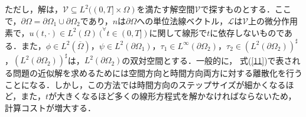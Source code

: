 \documentclass[a4paper,12pt]{nodlabpabw}
\begin{document}
ただし，解は，$\mathcal{V}\subseteq L^2((0,T]\times\Omega)$を満たす解空間$\mathcal{V}$で探すものとする．ここで，$\partial \Omega=\partial \Omega_1\cup\partial\Omega_2$であり，$n$は$\partial \Omega$への単位法線ベクトル，$\mathcal{L}$は$\mathcal{V}$上の微分作用素で，$u(t,\cdot)\in L^2(\Omega)\ (^{\forall} t\in(0,T])$に関して線形で$t$に依存しないものである．また，$\phi\in L^2(\overline{\Omega})$，$\psi\in L^2(\partial\Omega_1)$，$\tau_1\in L^{\infty}(\partial\Omega_2)$，$\tau_2\in (L^2(\partial\Omega_2))^{\sharp}$，$(L^2(\partial\Omega_2))^{\sharp}$は，$L^2(\partial\Omega_2)$の双対空間とする．一般的に，
式(\ref{11})で表される問題の近似解を求めるためには空間方向と時間方向両方に対する離散化を行うことになる\cite[pp.\ 22--27]{fem}．しかし，この方法では時間方向のステップサイズが細かくなるほど，また，$t$が大きくなるほど多くの線形方程式を解かなければならないため，計算コストが増大する．
\end{document}
